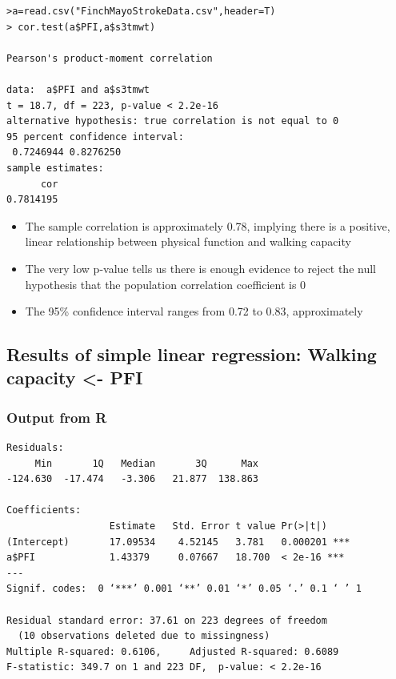 \documentclass[
]{book}
\providecommand{\tightlist}{%
  \setlength{\itemsep}{0pt}\setlength{\parskip}{0pt}}
\begin{document}
\begin{verbatim}
>a=read.csv("FinchMayoStrokeData.csv",header=T)
> cor.test(a$PFI,a$s3tmwt)

Pearson's product-moment correlation

data:  a$PFI and a$s3tmwt
t = 18.7, df = 223, p-value < 2.2e-16
alternative hypothesis: true correlation is not equal to 0
95 percent confidence interval:
 0.7246944 0.8276250
sample estimates:
      cor 
0.7814195 
\end{verbatim}

\begin{itemize}
\tightlist
\item
  The sample correlation is approximately 0.78, implying there is a positive, linear relationship between physical function and walking capacity
\item
  The very low p-value tells us there is enough evidence to reject the null hypothesis that the population correlation coefficient is 0
\item
  The 95\% confidence interval ranges from 0.72 to 0.83, approximately
\end{itemize}

\hypertarget{results-of-simple-linear-regression-walking-capacity---pfi}{%
\subsection{Results of simple linear regression: Walking capacity \textless- PFI}\label{results-of-simple-linear-regression-walking-capacity---pfi}}

\hypertarget{output-from-r-1}{%
\subsubsection{Output from R}\label{output-from-r-1}}

\begin{verbatim}
Residuals:
     Min       1Q   Median       3Q      Max 
-124.630  -17.474   -3.306   21.877  138.863 

Coefficients:
                  Estimate   Std. Error t value Pr(>|t|)    
(Intercept)       17.09534    4.52145   3.781   0.000201 ***
a$PFI             1.43379     0.07667   18.700  < 2e-16 ***
---
Signif. codes:  0 ‘***’ 0.001 ‘**’ 0.01 ‘*’ 0.05 ‘.’ 0.1 ‘ ’ 1 

Residual standard error: 37.61 on 223 degrees of freedom
  (10 observations deleted due to missingness)
Multiple R-squared: 0.6106,     Adjusted R-squared: 0.6089 
F-statistic: 349.7 on 1 and 223 DF,  p-value: < 2.2e-16
\end{verbatim}
\end{document}
